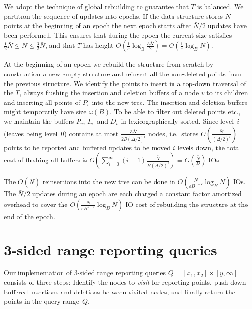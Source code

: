 \documentclass[11pt]{article}
\begin{document}
We adopt the technique of global rebuilding \cite[Chapter 5]{o83} to
guarantee that $T$ is balanced.  We partition the sequence of updates
into epochs. If the data structure stores $\bar{N}$ points at the
beginning of an epoch the next epoch starts after $\bar{N}/2$ updates
have been performed. This ensures that during the epoch the current
size satisfies $\frac{1}{2}\bar{N} \leq N \leq \frac{3}{2}\bar{N}$,
and that $T$ has height $O(\frac{1}{\varepsilon}\log_B
\frac{3\bar{N}}{2})=O(\frac{1}{\varepsilon}\log_B N)$.

At the beginning of an epoch we rebuild the structure from scratch by
construction a new empty structure and reinsert all the non-deleted
points from the previous structure. We identify the points to insert
in a top-down traversal of the $T$, always flushing the insertion and
deletion buffers of a node $v$ to its children and inserting all
points of $P_v$ into the new tree.  The insertion and deletion buffers
might temporarily have size $\omega(B)$. To be able to filter out
deleted points etc., we maintain the buffers $P_v$, $I_v$, and $D_v$
in lexicographically sorted.  Since level~$i$ (leaves being level~0)
contains at most $\frac{3\bar{N}}{2B(\Delta/2)^i}$ nodes, i.e.\ stores
$O(\frac{\bar{N}}{(\Delta/2)^i})$ points to be reported and buffered
updates to be moved $i$ levels down, the total cost of flushing all
buffers is $O(\sum_{i=0}^{\infty}
(i+1)\frac{\bar{N}}{B(\Delta/2)^i})=O(\frac{\bar{N}}{B})$ IOs.

The $O(\bar{N})$ reinsertions into the new tree can be done in
$O(\frac{\bar{N}}{\varepsilon B^{1-\varepsilon}} \log_B \bar{N})$
IOs. The $\bar{N}/2$ updates during an epoch are each charged a
constant factor amortized overhead to cover the
$O(\frac{\bar{N}}{\varepsilon B^{1-\varepsilon}} \log_B \bar{N})$ IO
cost of rebuilding the structure at the end of the epoch.

\section{3-sided range reporting queries}
\label{sec:3-sided}

Our implementation of 3-sided range reporting queries
$Q=[x_1,x_2]\times[y,\infty]$ consists of three steps: Identify the
nodes to \emph{visit} for reporting points, push down buffered
insertions and deletions between visited nodes, and finally return the
points in the query range~$Q$.
\end{document}
